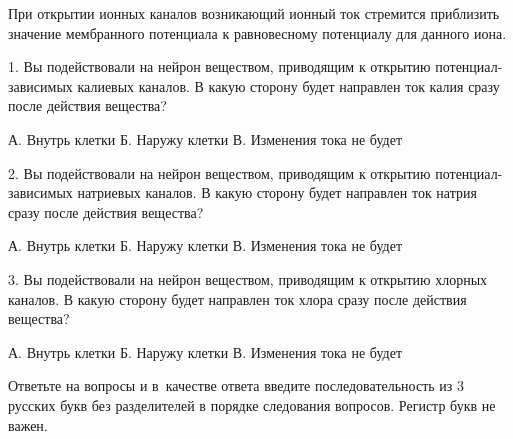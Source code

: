 
При открытии ионных каналов возникающий ионный ток стремится приблизить значение мембранного потенциала к равновесному потенциалу для данного иона.

1. Вы подействовали на нейрон веществом, приводящим к открытию потенциал-зависимых калиевых каналов. В какую сторону будет направлен ток калия сразу после действия вещества?

А. Внутрь клетки
Б. Наружу клетки
В. Изменения тока не будет

2. Вы подействовали на нейрон веществом, приводящим к открытию потенциал-зависимых натриевых каналов. В какую сторону будет направлен ток натрия сразу после действия вещества?

А. Внутрь клетки
Б. Наружу клетки
В. Изменения тока не будет

3. Вы подействовали на нейрон веществом, приводящим к открытию хлорных каналов. В какую сторону будет направлен ток хлора сразу после действия вещества?

А. Внутрь клетки
Б. Наружу клетки
В. Изменения тока не будет

Ответьте на вопросы и в качестве ответа введите последовательность из 3 русских букв без разделителей в порядке следования вопросов. Регистр букв не важен.



